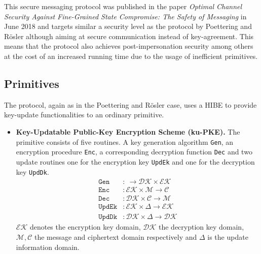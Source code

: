 \documentclass[11pt,a4paper,twoside,openright,bibliography=totoc]{scrbook}
\begin{document}
This secure messaging protocol was published in the paper
\textit{Optimal Channel Security Against Fine-Grained State Compromise: The Safety of Messaging}
in June 2018 and targets similar a security level as the protocol by
Poettering and Rösler although aiming at secure communication instead
of key-agreement. This means that the protocol also achieves
post-impersonation security among others at the cost of an increased running time due
to the usage of inefficient primitives. 

\subsection{Primitives}
\label{sec:primitives-1}

The protocol, again as in the Poettering and Rösler case, uses a HIBE to provide
key-update functionalities to an ordinary primitive.
\begin{itemize}
\item \textbf{Key-Updatable Public-Key Encryption Scheme (ku-PKE).} The primitive
  consists of five routines. A key generation algorithm \texttt{Gen},
  an encryption procedure \texttt{Enc}, a corresponding decryption
  function \texttt{Dec} and two update routines one for the
  encryption key \texttt{UpdEk} and one for the decryption key \texttt{UpdDk}.
  \begin{align*}
    \texttt{Gen} & : \ \rightarrow \mathcal{DK} \times \mathcal{EK} \\
    \texttt{Enc} & : \mathcal{EK} \times \mathcal{M} \rightarrow \mathcal{C} \\
    \texttt{Dec} & : \mathcal{DK} \times \mathcal{C} \rightarrow \mathcal{M} \\
    \texttt{UpdEk} & : \mathcal{EK} \times \Delta \rightarrow \mathcal{EK} \\
    \texttt{UpdDk} & : \mathcal{DK} \times \Delta \rightarrow \mathcal{DK}
  \end{align*}
  $\mathcal{EK}$ denotes the encryption key domain, $\mathcal{DK}$ the
  decryption key domain, $\mathcal{M}, \mathcal{C}$ the message and
  ciphertext domain respectively and $\Delta$ is the update information domain.
\end{itemize}
\end{document}
